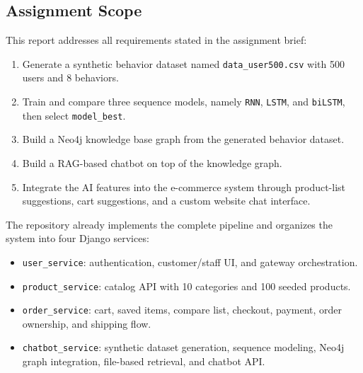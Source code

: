 \documentclass[12pt,a4paper]{article}
\begin{document}
\subsection{Assignment Scope}
This report addresses all requirements stated in the assignment brief:
\begin{enumerate}[label=\arabic*.]
  \item Generate a synthetic behavior dataset named \texttt{data\_user500.csv} with 500 users and 8 behaviors.
  \item Train and compare three sequence models, namely \texttt{RNN}, \texttt{LSTM}, and \texttt{biLSTM}, then select \texttt{model\_best}.
  \item Build a Neo4j knowledge base graph from the generated behavior dataset.
  \item Build a RAG-based chatbot on top of the knowledge graph.
  \item Integrate the AI features into the e-commerce system through product-list suggestions, cart suggestions, and a custom website chat interface.
\end{enumerate}

The repository already implements the complete pipeline and organizes the system into four Django services:
\begin{itemize}
  \item \texttt{user\_service}: authentication, customer/staff UI, and gateway orchestration.
  \item \texttt{product\_service}: catalog API with 10 categories and 100 seeded products.
  \item \texttt{order\_service}: cart, saved items, compare list, checkout, payment, order ownership, and shipping flow.
  \item \texttt{chatbot\_service}: synthetic dataset generation, sequence modeling, Neo4j graph integration, file-based retrieval, and chatbot API.
\end{itemize}
\end{document}
